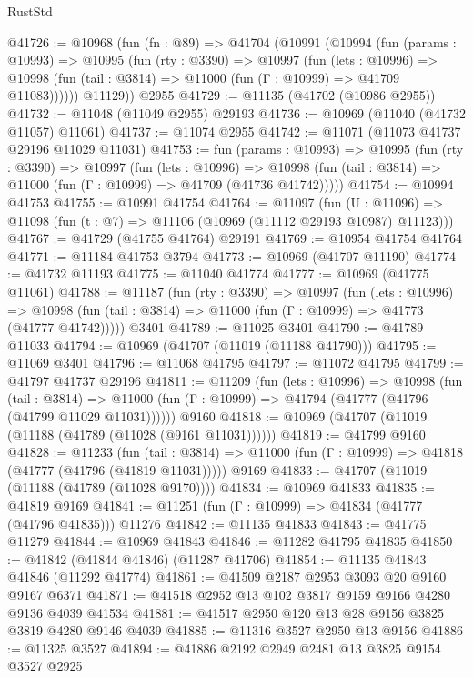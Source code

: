 \begin{lexlean}{RustStd}
\begin{coremodule}
@41726 := @10968
    (fun (fn : @89) =>
    @41704
      (@10991
        (@10994
          (fun (params : @10993) =>
          @10995
            (fun (rty : @3390) =>
            @10997
              (fun (lets : @10996) =>
              @10998 (fun (tail : @3814) => @11000 (fun (Γ : @10999) => @41709 @11083))))))
        @11129))
    @2955
@41729 := @11135 (@41702 (@10986 @2955))
@41732 := @11048 (@11049 @2955) @29193
@41736 := @10969 (@11040 (@41732 @11057) @11061)
@41737 := @11074 @2955
@41742 := @11071 (@11073 @41737 @29196 @11029 @11031)
@41753 := fun (params : @10993) =>
  @10995
    (fun (rty : @3390) =>
    @10997
      (fun (lets : @10996) =>
      @10998 (fun (tail : @3814) => @11000 (fun (Γ : @10999) => @41709 (@41736 @41742)))))
@41754 := @10994 @41753
@41755 := @10991 @41754
@41764 := @11097
    (fun (U : @11096) => @11098 (fun (t : @7) => @11106 (@10969 (@11112 @29193 @10987) @11123)))
@41767 := @41729 (@41755 @41764) @29191
@41769 := @10954 @41754 @41764
@41771 := @11184 @41753 @3794
@41773 := @10969 (@41707 @11190)
@41774 := @41732 @11193
@41775 := @11040 @41774
@41777 := @10969 (@41775 @11061)
@41788 := @11187
    (fun (rty : @3390) =>
    @10997
      (fun (lets : @10996) =>
      @10998 (fun (tail : @3814) => @11000 (fun (Γ : @10999) => @41773 (@41777 @41742)))))
    @3401
@41789 := @11025 @3401
@41790 := @41789 @11033
@41794 := @10969 (@41707 (@11019 (@11188 @41790)))
@41795 := @11069 @3401
@41796 := @11068 @41795
@41797 := @11072 @41795
@41799 := @41797 @41737 @29196
@41811 := @11209
    (fun (lets : @10996) =>
    @10998
      (fun (tail : @3814) =>
      @11000 (fun (Γ : @10999) => @41794 (@41777 (@41796 (@41799 @11029 @11031))))))
    @9160
@41818 := @10969 (@41707 (@11019 (@11188 (@41789 (@11028 (@9161 @11031))))))
@41819 := @41799 @9160
@41828 := @11233
    (fun (tail : @3814) => @11000 (fun (Γ : @10999) => @41818 (@41777 (@41796 (@41819 @11031)))))
    @9169
@41833 := @41707 (@11019 (@11188 (@41789 (@11028 @9170))))
@41834 := @10969 @41833
@41835 := @41819 @9169
@41841 := @11251 (fun (Γ : @10999) => @41834 (@41777 (@41796 @41835))) @11276
@41842 := @11135 @41833
@41843 := @41775 @11279
@41844 := @10969 @41843
@41846 := @11282 @41795 @41835
@41850 := @41842 (@41844 @41846) (@11287 @41706)
@41854 := @11135 @41843 @41846 (@11292 @41774)
@41861 := @41509 @2187 @2953 @3093 @20 @9160 @9167 @6371
@41871 := @41518 @2952 @13 @102 @3817 @9159 @9166 @4280 @9136 @4039 @41534
@41881 := @41517 @2950 @120 @13 @28 @9156 @3825 @3819 @4280 @9146 @4039
@41885 := @11316 @3527 @2950 @13 @9156
@41886 := @11325 @3527
@41894 := @41886 @2192 @2949 @2481 @13 @3825 @9154 @3527 @2925

\end{coremodule}
\end{lexlean}

